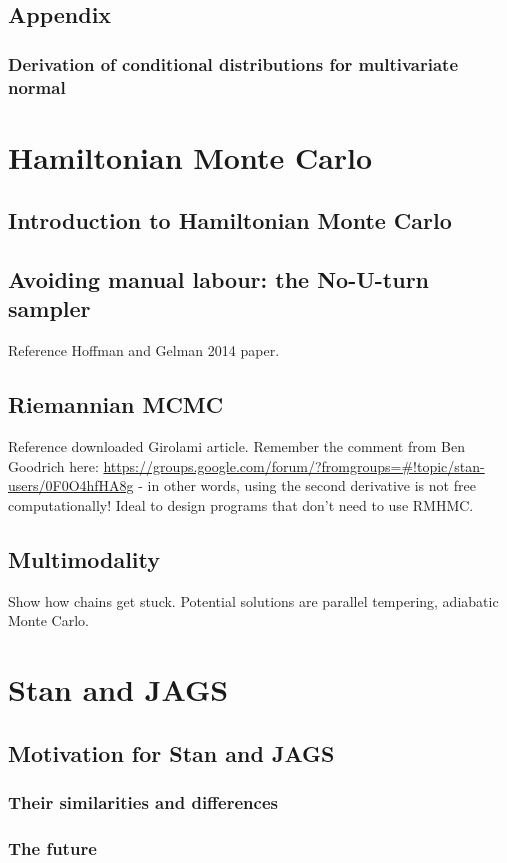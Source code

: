 \documentclass[11pt,fullpage]{book}
\begin{document}
\section{Appendix}
\subsection{Derivation of conditional distributions for multivariate normal}

\chapter{Hamiltonian Monte Carlo}\label{chap:HMC}
\section{Introduction to Hamiltonian Monte Carlo}
\section{Avoiding manual labour: the No-U-turn sampler}
Reference Hoffman and Gelman 2014 paper.
\section{Riemannian MCMC}
Reference downloaded Girolami article.
Remember the comment from Ben Goodrich here: \url{https://groups.google.com/forum/?fromgroups=#!topic/stan-users/0F0O4hfHA8g} - in other words, using the second derivative is not free computationally! Ideal to design programs that don't need to use RMHMC.

\section{Multimodality}
Show how chains get stuck. Potential solutions are parallel tempering, adiabatic Monte Carlo.


\chapter{Stan and JAGS}\label{chap:StanJAGS}
\section{Motivation for Stan and JAGS}
\subsection{Their similarities and differences}
\subsection{The future}
\end{document}
